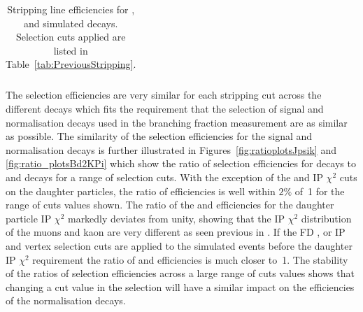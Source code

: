 {\begin{landscape}
\begin{table}[htbp]
\begin{center}
\begin{tabular}{p{6cm}lll}
\end{tabular}
\vspace{0.7cm}
\caption{Stripping line efficiencies for \bsmumu, \bhh and  simulated decays. Selection cuts applied are listed in Table~\ref{tab:PreviousStripping}.  }
\label{tab:Run1strippingEff}
\end{center}
\end{table}
\vspace*{\fill}
\end{landscape}
}


The selection efficiencies are very similar for each stripping cut across the different decays which fits the requirement that the selection of signal and normalisation decays used in the branching fraction measurement are as similar as possible. The similarity of the selection efficiencies for the signal and normalisation decays is further illustrated in Figures~\ref{fig:ratioplotsJpsik} and \ref{fig:ratio_plotsBd2KPi} which show the ratio of selection efficiencies for \bsmumu decays to \bujspik and \bdkpi decays for a range of selection cuts. With the exception of the \bsmumu and \bujpsik IP $\chi^{2}$ cuts on the daughter particles, the ratio of efficiencies is well within $2\%$ of~1 for the range of cuts values shown. The ratio of the \bsmumu and \bujpsik efficiencies for the daughter particle IP $\chi^{2}$ markedly deviates from unity, showing that the IP $\chi^{2}$ distribution of the muons and kaon are very different as seen previous in \cite{Diego}. If the FD \chisqd, \bs or \jpsi IP \chisqd and vertex \chisqd selection cuts are applied to the simulated events before the daughter IP $\chi^{2}$ requirement the ratio of \bmumu and \bujpsik efficiencies is much closer to~1. The stability of the ratios of selection efficiencies across a large range of cuts values shows that changing a cut value in the \bmumu selection will have a similar impact on the efficiencies of the normalisation decays. 


